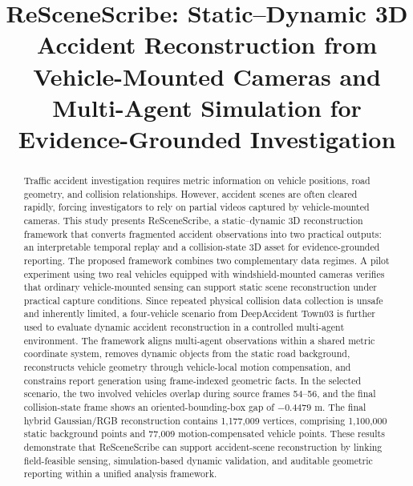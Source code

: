 \documentclass[conference]{IEEEtran}
\begin{document}
\title{ReSceneScribe: Static--Dynamic 3D Accident Reconstruction from Vehicle-Mounted Cameras and Multi-Agent Simulation for Evidence-Grounded Investigation}

\author{
}

\maketitle

\begin{abstract}
Traffic accident investigation requires metric information on vehicle positions,
road geometry, and collision relationships. However, accident scenes are often
cleared rapidly, forcing investigators to rely on partial videos captured by
vehicle-mounted cameras. This study presents ReSceneScribe, a static--dynamic
3D reconstruction framework that converts fragmented accident observations into
two practical outputs: an interpretable temporal replay and a collision-state
3D asset for evidence-grounded reporting. The proposed framework combines two
complementary data regimes. A pilot experiment using two real vehicles equipped
with windshield-mounted cameras verifies that ordinary vehicle-mounted sensing
can support static scene reconstruction under practical capture conditions.
Since repeated physical collision data collection is unsafe and inherently
limited, a four-vehicle scenario from DeepAccident Town03 is further used to
evaluate dynamic accident reconstruction in a controlled multi-agent
environment. The framework aligns multi-agent observations within a shared
metric coordinate system, removes dynamic objects from the static road
background, reconstructs vehicle geometry through vehicle-local motion
compensation, and constrains report generation using frame-indexed geometric
facts. In the selected scenario, the two involved vehicles overlap during source
frames 54--56, and the final collision-state frame shows an
oriented-bounding-box gap of $-0.4479$ m. The final hybrid Gaussian/RGB
reconstruction contains 1,177,009 vertices, comprising 1,100,000 static
background points and 77,009 motion-compensated vehicle points. These results
demonstrate that ReSceneScribe can support accident-scene reconstruction by
linking field-feasible sensing, simulation-based dynamic validation, and
auditable geometric reporting within a unified analysis framework.
\end{abstract}
\end{document}
